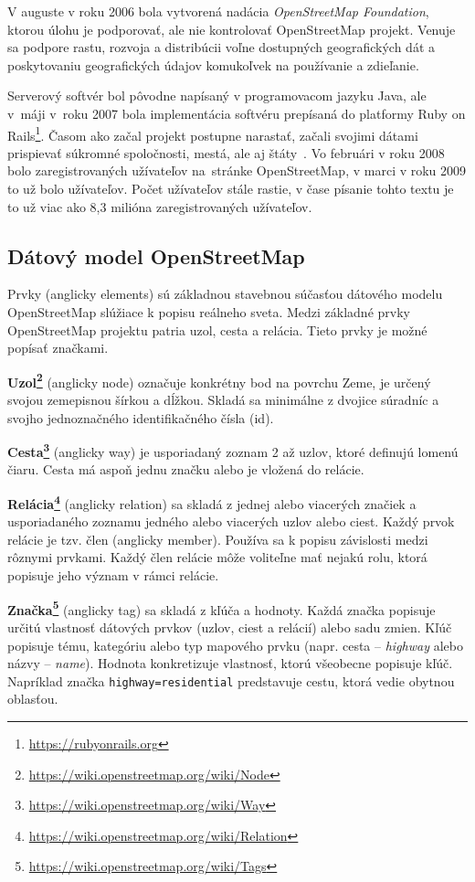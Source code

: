 V auguste v roku 2006 bola vytvorená nadácia \emph{OpenStreetMap Foundation}, ktorou úlohu je podporovať, ale nie kontrolovať OpenStreetMap projekt. Venuje sa podpore rastu, rozvoja a distribúcii voľne dostupných geografických dát a poskytovaniu geografických údajov komukoľvek na používanie a zdieľanie.

Serverový softvér bol pôvodne napísaný v programovacom jazyku Java, ale v~máji v~roku 2007 bola implementácia softvéru prepísaná do platformy Ruby on Rails\footnote{\url{https://rubyonrails.org}}. Časom ako začal projekt postupne narastať, začali svojimi dátami prispievať súkromné spoločnosti, mestá, ale aj štáty~\cite{bennett2010openstreetmap}. Vo februári v roku 2008 bolo zaregistrovaných  užívateľov na~stránke OpenStreetMap, v marci v roku 2009 to už bolo  užívateľov. Počet užívateľov stále rastie, v čase písanie tohto textu je to už viac ako 8,3 milióna zaregistrovaných užívateľov.

\subsection{Dátový model OpenStreetMap}
Prvky (anglicky elements) sú základnou stavebnou súčasťou dátového modelu OpenStreetMap slúžiace k popisu reálneho sveta. Medzi základné prvky OpenStreetMap projektu patria uzol, cesta a relácia. Tieto prvky je možné popísať značkami.

\textbf{Uzol\footnote{\url{https://wiki.openstreetmap.org/wiki/Node}}} (anglicky node) označuje konkrétny bod na povrchu Zeme, je určený svojou zemepisnou šírkou a dĺžkou. Skladá sa minimálne z dvojice súradníc a svojho jednoznačného identifikačného čísla (id).

\textbf{Cesta\footnote{\url{https://wiki.openstreetmap.org/wiki/Way}}} (anglicky way) je usporiadaný zoznam 2 až  uzlov, ktoré definujú lomenú čiaru. Cesta má aspoň jednu značku alebo je vložená do relácie.

\textbf{Relácia\footnote{\url{https://wiki.openstreetmap.org/wiki/Relation}}} (anglicky relation) sa skladá z jednej alebo viacerých značiek a usporiadaného zoznamu jedného alebo viacerých uzlov alebo ciest. Každý prvok relácie je tzv. člen (anglicky member). Používa sa k popisu závislosti medzi rôznymi prvkami. Každý člen relácie môže voliteľne mať nejakú rolu, ktorá popisuje jeho význam v rámci relácie.

\textbf{Značka\footnote{\url{https://wiki.openstreetmap.org/wiki/Tags}}} (anglicky tag) sa skladá z kľúča a hodnoty. Každá značka popisuje určitú vlastnosť dátových prvkov (uzlov, ciest a relácií) alebo sadu zmien. Kľúč popisuje tému, kategóriu alebo typ mapového prvku (napr. cesta \--- \emph{highway} alebo názvy \--- \emph{name}). Hodnota konkretizuje vlastnosť, ktorú všeobecne popisuje kľúč. Napríklad značka \texttt{highway=residential} predstavuje cestu, ktorá vedie obytnou oblasťou.

